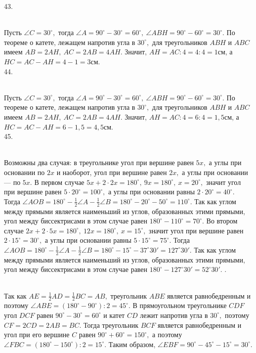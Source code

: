 43. \begin{figure}[ht!]
\end{figure}\\
Пусть $\angle C=30^\circ,$ тогда $\angle A=90^\circ-30^\circ=60^\circ,\ \angle ABH=90^\circ-60^\circ=30^\circ.$ По теореме о катете, лежащем напротив угла в $30^\circ,$ для треугольников $ABH$ и $ABC$ имеем $AB=2AH,\ AC=2AB=4AH.$ Значит, $AH=AC:4=4:4=1$см, а $HC=AC-AH=4-1=3$см.\\
44. \begin{figure}[ht!]
\end{figure}\\
Пусть $\angle C=30^\circ,$ тогда $\angle A=90^\circ-30^\circ=60^\circ,\ \angle ABH=90^\circ-60^\circ=30^\circ.$ По теореме о катете, лежащем напротив угла в $30^\circ,$ для треугольников $ABH$ и $ABC$ имеем $AB=2AH,\ AC=2AB=4AH.$ Значит, $AH=AC:4=6:4=1,5$см, а $HC=AC-AH=6-1,5=4,5$см.\\
45. \begin{figure}[ht!]
\end{figure}\\
Возможны два случая: в треугольнике угол при вершине равен $5x,$ а углы при основании по $2x$ и наоборот, угол при вершине равен $2x,$ а углы при основании --- по $5x.$ В первом случае $5x+2\cdot2x=180^\circ,\ 9x=180^\circ,\ x=20^\circ,$ значит угол при вершине равен $5\cdot20^\circ=100^\circ,$ а углы при основании равны $2\cdot20^\circ=40^\circ.$ Тогда $\angle AOB=180^\circ-\frac{1}{2}\angle A-\frac{1}{2}\angle B=180^\circ-20^\circ-50^\circ=110^\circ.$ Так как углом между прямыми является наименьший из углов, образованных этими прямыми, угол между биссектрисами в этом случае равен $180^\circ-110^\circ=70^\circ.$ Во втором случае $2x+2\cdot5x=180^\circ,\ 12x=180^\circ,\ x=15^\circ,$ значит угол при вершине равен $2\cdot15^\circ=30^\circ,$ а углы при основании равны $5\cdot15^\circ=75^\circ.$
Тогда $\angle AOB=180^\circ-\frac{1}{2}\angle A-\frac{1}{2}\angle B=180^\circ-15^\circ-37^\circ30'=127^\circ30'.$ Так как углом между прямыми является наименьший из углов, образованных этими прямыми, угол между биссектрисами в этом случае равен $180^\circ-127^\circ30'=52^\circ30'.$\newpage
{}. \begin{figure}[ht!]
\end{figure}\\
Так как $AE=\frac{1}{2}AD=\frac{1}{2}BC=AB,$ треугольник $ABE$ является равнобедренным и поэтому $\angle ABE=(180^\circ-90^\circ):2=45^\circ.$ В прямоугольном треугольнике $CDF$ угол $DCF$ равен $90^\circ-30^\circ=60^\circ$ и катет $CD$ лежит напротив угла в $30^\circ,$ поэтому $CF=2CD=2AB=BC.$ Тогда треугольник $BCF$ является равнобедренным и угол при его вершине $C$ равен $90^\circ+60^\circ=150^\circ,$ а поэтому $\angle FBC=(180^\circ-150^\circ):2=15^\circ.$ Таким образом, $\angle EBF=90^\circ-45^\circ-15^\circ=30^\circ.$\\
